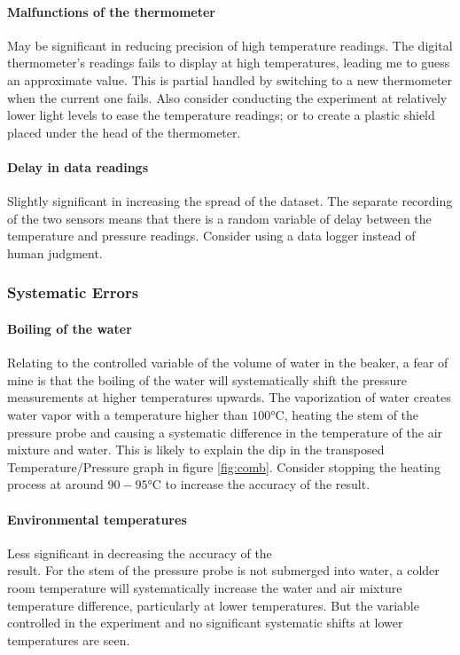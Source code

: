 \documentclass[a4paper,12pt]{article}
\begin{document}
\paragraph{Malfunctions of the thermometer}
May be significant in reducing precision of high temperature readings. The digital thermometer's readings fails to display at high temperatures, leading me to guess an approximate value. This is partial handled by switching to a new thermometer when the current one fails. Also consider conducting the experiment at relatively lower light levels to ease the temperature readings; or to create a plastic shield placed under the head of the thermometer.

\paragraph{Delay in data readings}
Slightly significant in increasing the spread of the dataset. The separate recording of the two sensors means that there is a random variable of delay between the temperature and pressure readings. Consider using a data logger instead of human judgment.

\subsubsection{Systematic Errors}
\paragraph{Boiling of the water}
Relating to the controlled variable of the volume of water in the beaker, a fear of mine is that the boiling of the water will systematically shift the pressure measurements at higher temperatures upwards. The vaporization of water creates water vapor with a temperature higher than $100\si{\celsius}$, heating the stem of the pressure probe and causing a systematic difference in the temperature of the air mixture and water. This is likely to explain the dip in the transposed Temperature/Pressure graph in figure \ref{fig:comb}. Consider stopping the heating process at around $90-95\si{\celsius}$ to increase the accuracy of the result.

\paragraph{Environmental temperatures}
Less significant in decreasing the accuracy of the \\result. For the stem of the pressure probe is not submerged into water, a colder room temperature will systematically increase the water and air mixture temperature difference, particularly at lower temperatures. But the variable controlled in the experiment and no significant systematic shifts at lower temperatures are seen.
\end{document}
